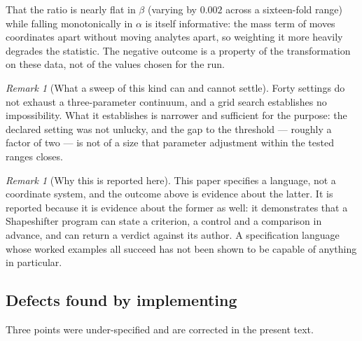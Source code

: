 \documentclass[11pt,twocolumn,a4paper]{article}
\theoremstyle{ssthm}
\theoremstyle{definition}
\theoremstyle{remark}
\newtheorem{remark}[theorem]{Remark}
\begin{document}
That the ratio is nearly flat in $\beta$ (varying by $0.002$ across a
sixteen-fold range) while falling monotonically in $\alpha$ is itself
informative: the mass term of  moves coordinates apart
without moving analytes apart, so weighting it more heavily degrades the
statistic. The negative outcome is a property of the transformation on
these data, not of the values chosen for the run.

\begin{remark}[What a sweep of this kind can and cannot settle]
\label{rem:sweep-limits}
Forty settings do not exhaust a three-parameter continuum, and a grid
search establishes no impossibility. What it establishes is narrower and
sufficient for the purpose: the declared setting was not unlucky, and the
gap to the threshold --- roughly a factor of two --- is not of a size that
parameter adjustment within the tested ranges closes.
\end{remark}


\begin{remark}[Why this is reported here]
\label{rem:why-report}
This paper specifies a language, not a coordinate system, and the
outcome above is evidence about the latter. It is reported because it is
evidence about the former as well: it demonstrates that a Shapeshifter
program can state a criterion, a control and a comparison in advance, and
can return a verdict against its author. A specification language whose
worked examples all succeed has not been shown to be capable of anything
in particular.
\end{remark}

\subsection{Defects found by implementing}
\label{rem:found-defects}

Three points were under-specified and are corrected in the present text.
\end{document}
